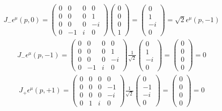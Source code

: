 \documentclass[11pt]{article}
\def\eps{\epsilon}
\begin{document}
\begin{eqnarray}
    J_- \eps^\mu(p,0) = 
    \begin{pmatrix}
        0 & 0 & 0 & 0\\
        0 & 0 & 0 & 1 \\
        0 & 0 & 0 & -i \\
        0 & - 1 & i & 0
    \end{pmatrix}
    \begin{pmatrix}
        0 \\ 0 \\ 0 \\ 1
    \end{pmatrix}
    =
    \begin{pmatrix}
        0 \\ 1 \\ -i \\ 0
    \end{pmatrix}
    =\sqrt{2} \eps^\mu(p,-1) 
\end{eqnarray}
\begin{eqnarray}
    J_- \eps^\mu(p,-1) = 
    \begin{pmatrix}
        0 & 0 & 0 & 0\\
        0 & 0 & 0 & 1 \\
        0 & 0 & 0 & -i \\
        0 & - 1 & i & 0
    \end{pmatrix}
    \frac{1}{\sqrt 2}
    \begin{pmatrix}
        0 \\ 1 \\ -i \\ 0
    \end{pmatrix}
    =    
    \begin{pmatrix}
        0 \\ 0 \\ 0 \\ 0
    \end{pmatrix}
    = 0
\end{eqnarray}
\begin{eqnarray}
    J_+ \eps^\mu(p,+1) =
    \begin{pmatrix}
        0 & 0 & 0 & 0\\
        0 & 0 & 0 &  -1 \\
        0 & 0 & 0 & -i \\
        0 &  1 & i & 0
    \end{pmatrix}
    \frac{1}{\sqrt 2}
    \begin{pmatrix}
        0 \\ -1 \\ -i \\ 0
    \end{pmatrix}
    = 
    \begin{pmatrix}
        0 \\ 0 \\ 0 \\ 0
    \end{pmatrix}
    =0
\end{eqnarray}
\end{document}
